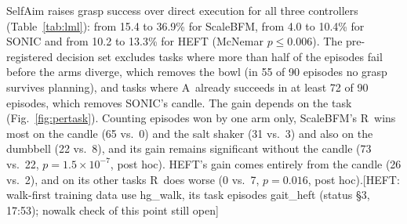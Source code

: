 \documentclass[conference]{IEEEtran}
\newif\ifdraft \drafttrue
\newcommand{\dnote}[1]{\ifdraft{\color{red}\footnotesize[#1]}\fi}
\newcommand{\Ad}{\textsc{A}}       %
\newcommand{\Rr}{\textsc{R}}       %
\begin{document}
SelfAim raises grasp success over direct execution for all three controllers (Table~\ref{tab:lml}): from 15.4 to 36.9\% for ScaleBFM, from 4.0 to 10.4\% for SONIC and from 10.2 to 13.3\% for HEFT (McNemar $p\le0.006$). The pre-registered decision set excludes tasks where more than half of the episodes fail before the arms diverge, which removes the bowl (in 55 of 90 episodes no grasp survives planning), and tasks where \Ad\ already succeeds in at least 72 of 90 episodes, which removes SONIC's candle. The gain depends on the task (Fig.~\ref{fig:pertask}). Counting episodes won by one arm only, ScaleBFM's \Rr\ wins most on the candle (65 vs.\ 0) and the salt shaker (31 vs.\ 3) and also on the dumbbell (22 vs.\ 8), and its gain remains significant without the candle (73 vs.\ 22, $p=1.5\times10^{-7}$, post hoc). HEFT's gain comes entirely from the candle (26 vs.\ 2), and on its other tasks \Rr\ does worse (0 vs.\ 7, $p=0.016$, post hoc).\dnote{HEFT: walk-first training data use hg\_walk, its task episodes gait\_heft (status §3, 17:53); nowalk check of this point still open}
\end{document}
